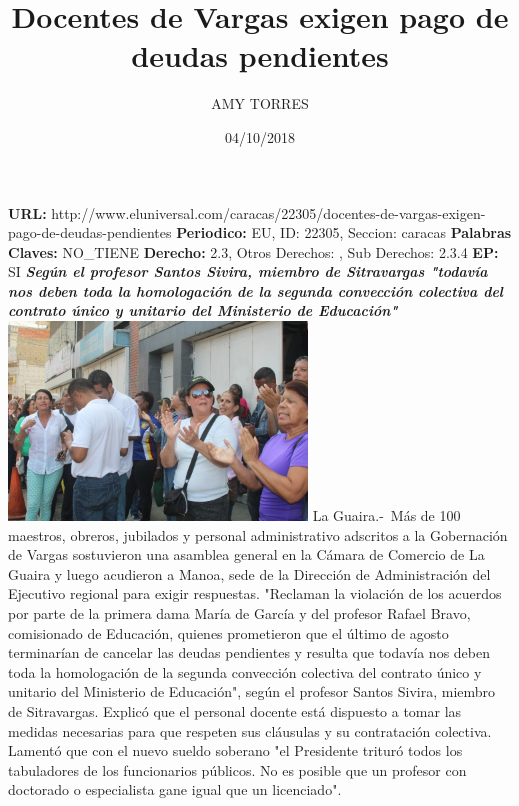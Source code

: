 \documentclass{article}%
\title{\textbf{Docentes de Vargas exigen pago de deudas pendientes}}%
\author{AMY TORRES}%
\date{04/10/2018}%
\begin{document}
%
\normalsize%
\maketitle%
\textbf{URL: }%
http://www.eluniversal.com/caracas/22305/docentes{-}de{-}vargas{-}exigen{-}pago{-}de{-}deudas{-}pendientes\newline%
%
\textbf{Periodico: }%
EU, %
ID: %
22305, %
Seccion: %
caracas\newline%
%
\textbf{Palabras Claves: }%
NO\_TIENE\newline%
%
\textbf{Derecho: }%
2.3, %
Otros Derechos: %
, %
Sub Derechos: %
2.3.4\newline%
%
\textbf{EP: }%
SI\newline%
\newline%
%
\textbf{\textit{Según el profesor Santos Sivira, miembro de Sitravargas "todavía nos deben toda la homologación de la segunda convección colectiva del contrato único y unitario del Ministerio de Educación"}}%
\newline%
\newline%
%
\includegraphics[width=300px]{200.jpg}%
\newline%
%
La Guaira.{-}~Más de 100 maestros, obreros, jubilados y personal administrativo adscritos a la Gobernación de Vargas sostuvieron una asamblea general en la Cámara de Comercio de La Guaira y luego acudieron a Manoa, sede de la Dirección de Administración del Ejecutivo regional para exigir respuestas.%
\newline%
%
"Reclaman la violación de los acuerdos por parte de la primera dama María de García y del profesor Rafael Bravo, comisionado de Educación, quienes prometieron que el último de agosto terminarían de cancelar las deudas pendientes y resulta que todavía nos deben toda la homologación de la segunda convección colectiva del contrato único y unitario del Ministerio de Educación", según el profesor Santos Sivira, miembro de Sitravargas.%
\newline%
%
Explicó que el personal docente está dispuesto a tomar las medidas necesarias para que respeten sus cláusulas y su contratación colectiva. Lamentó que con el nuevo sueldo soberano "el Presidente trituró todos los tabuladores de los funcionarios públicos. No es posible que un profesor con doctorado o especialista gane igual que un licenciado".%
\end{document}
